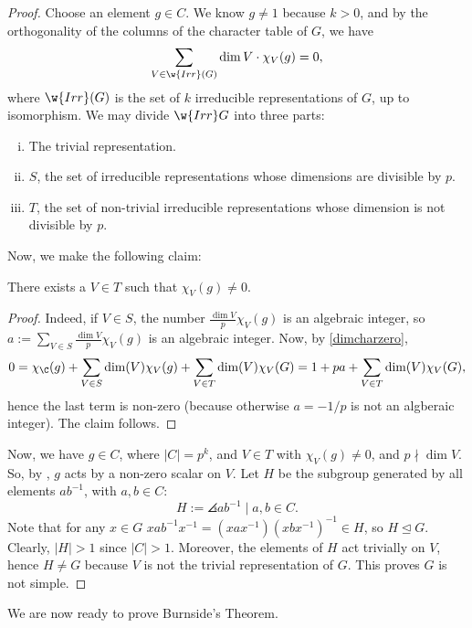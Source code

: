 \begin{proof}
Choose an element $g \in C$. We know $g \neq 1$ because $k>0$, and by the orthogonality of the columns of the character table of $G$, we have
\begin{align} \label{dimcharzero}
 \sum_{V \in \w{Irr}(G)}\dim V\cdot \chi_V(g)=0,
\end{align}
where $\w{Irr} (G)$ is the set of $k$ irreducible representations of $G$, up to isomorphism. We may divide $\w{Irr} G$ into three parts:
\begin{enumerate}[(i)]
    \item The trivial representation.
    \item $S$, the set of irreducible representations whose dimensions are divisible by $p$.
    \item $T$, the set of non-trivial irreducible representations whose dimension is not divisible by $p$.
\end{enumerate}

Now, we make the following claim:
\begin{claim}
    There exists a $V \in T$ such that $\chi_V(g) \neq 0$.
\end{claim}

\begin{proof}
    Indeed, if $V \in S$, the number $\frac{\dim V}{p}\chi_V(g)$ is an algebraic integer, so $a:= \sum_{V \in S}\frac{\dim V}{p}\chi _V(g)$ is an algebraic integer. Now, by \eqref{dimcharzero},
    \begin{align*}
        0 = \chi_\C(g) + \sum_{V \in S}\dim(V)\chi _V(g)+\sum_{V \in T}\dim (V)\chi _V(G)=1 + pa+\sum_{V \in T}\dim(V) \chi_V(G),
    \end{align*}
    hence the last term is non-zero (because otherwise $a=-1/p$ is not an algberaic integer). The claim follows.
\end{proof}
Now, we have $g \in C$, where $|C|=p^k$, and $V \in T$ with $\chi_V(g) \neq 0$, and $p \nmid \dim V$. So, by , $g$ acts by a non-zero scalar on $V$. Let $H$ be the subgroup generated by all elements $ab^{-1}$, with $a,b \in C$:
$$H:= \angles{ab^{-1}\mid a,b \in C}.$$
Note that for any $x \in G$ $xab^{-1}x^{-1}=(xax^{-1})(xbx^{-1})^{-1} \in H$, so $H \unlhd G$. Clearly, $|H|>1$ since $|C|>1$. Moreover, the elements of $H$ act trivially on $V$, hence $H \neq G$ because $V$ is not the trivial representation of $G$. This proves $G$ is not simple.
\end{proof}

We are now ready to prove Burnside's Theorem.

